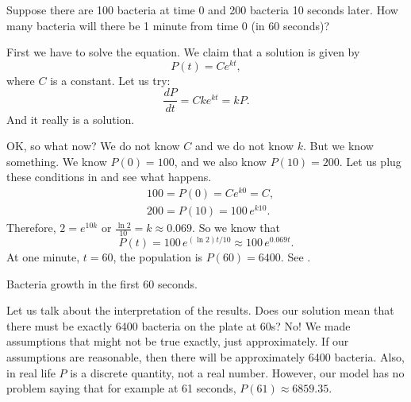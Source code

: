 \begin{example}
Suppose there are 100 bacteria at time 0 and 200 bacteria 10 seconds later.
How many bacteria will there be 1 minute from time 0 (in 60 seconds)?

First we have to solve the equation.  We claim that a solution is given by
\begin{equation*}
P(t) = C e^{kt} ,
\end{equation*}
where $C$ is a constant.  Let us try:
\begin{equation*}
\frac{dP}{dt} = C k e^{kt} = k P .
\end{equation*}
And it really is a solution.

OK, so what now?  We do not know $C$ and we do not know $k$.  But we know
something.  We know $P(0) = 100$, and we also know 
$P(10) = 200$.  Let us plug these conditions in and see what happens.
\begin{align*}
& 100 = P(0) = C e^{k0} = C ,\\
& 200 = P(10) = 100 \, e^{k10} .
\end{align*}
Therefore, $2 = e^{10k}$ or $\frac{\ln 2}{10} = k \approx 0.069$.
So we know that
\begin{equation*}
P(t) = 100 \, e^{(\ln 2) t / 10} \approx 100 \, e^{0.069 t} .
\end{equation*}
At one minute, $t=60$, the population is $P(60) = 6400$.  See
.

\begin{diffyfloatingfigurepdfonly}{3.1in}
\capstart
\begin{center}
\caption{Bacteria growth in the first 60 seconds.\label{intro:plotbactfig}}
\end{center}
\end{diffyfloatingfigurepdfonly}

Let us talk about the interpretation of the results.  Does our solution
mean that
there must be exactly 6400 bacteria on the plate at 60s?  No!  We made
assumptions that might not be true exactly, just approximately.
If our assumptions are reasonable,
then there will be approximately 6400 bacteria.
Also, in real life $P$ is a
discrete quantity, not a real number.  However, our model has no problem saying
that for example at 61 seconds, $P(61) \approx 6859.35$.
\end{example}

